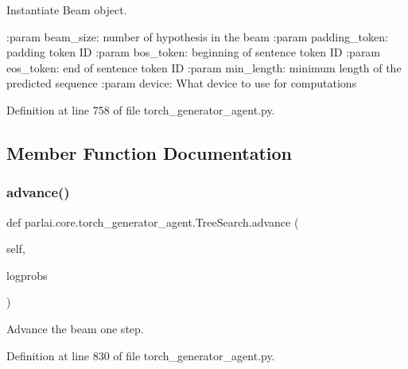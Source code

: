 \begin{DoxyVerb}Instantiate Beam object.

:param beam_size:
    number of hypothesis in the beam
:param padding_token:
    padding token ID
:param bos_token:
    beginning of sentence token ID
:param eos_token:
    end of sentence token ID
:param min_length:
    minimum length of the predicted sequence
:param device:
    What device to use for computations
\end{DoxyVerb}
 

Definition at line 758 of file torch\+\_\+generator\+\_\+agent.\+py.



\subsection{Member Function Documentation}
\mbox{\label{classparlai_1_1core_1_1torch__generator__agent_1_1TreeSearch_a9f371e57095af5b22ff5eae4c57326c8}} 
\subsubsection{\texorpdfstring{advance()}{advance()}}
{\footnotesize\ttfamily def parlai.\+core.\+torch\+\_\+generator\+\_\+agent.\+Tree\+Search.\+advance (\begin{DoxyParamCaption}\item[{}]{self,  }\item[{}]{logprobs }\end{DoxyParamCaption})}

\begin{DoxyVerb}Advance the beam one step.\end{DoxyVerb}
 

Definition at line 830 of file torch\+\_\+generator\+\_\+agent.\+py.

\mbox{\label{classparlai_1_1core_1_1torch__generator__agent_1_1TreeSearch_aced42f37b580f876286b5075ba188b2a}} 
